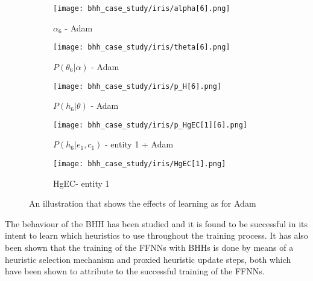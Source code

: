 \begin{figure}[htbp]
      \begin{subfigure}{0.5\textwidth}
            \centering
            \texttt{[image: bhh\_case\_study/iris/alpha[6].png]}
            \caption{$\alpha_{6}$ - \Acs{Adam}}
            \label{fig:results:case_study:iris:adam:alpha:6}
      \end{subfigure}
      \begin{subfigure}{0.5\textwidth}
            \centering
            \texttt{[image: bhh\_case\_study/iris/theta[6].png]}
            \caption{$P(\theta_{6} | \alpha)$ - \Acs{Adam}}
            \label{fig:results:case_study:iris:adam:p_theta:6}
      \end{subfigure}
      \par\bigskip
      \begin{subfigure}{0.5\textwidth}
            \centering
            \texttt{[image: bhh\_case\_study/iris/p\_H[6].png]}
            \caption{$P\left(h_{6} | \theta \right)$ - \Acs{Adam}}
            \label{fig:results:case_study:iris:adam:p_H:6}
      \end{subfigure}
      \begin{subfigure}{0.5\textwidth}
            \centering
            \texttt{[image: bhh\_case\_study/iris/p\_HgEC[1][6].png]}
            \caption{$P\left(h_{6}|e_{1},c_{1}\right)$ - entity 1 + \Acs{Adam} }
            \label{fig:results:case_study:iris:adam:p_HgEC:1:6}
      \end{subfigure}
      \par\bigskip
      \begin{subfigure}{\textwidth}
            \centering
            \texttt{[image: bhh\_case\_study/iris/HgEC[1].png]}
            \caption{HgEC\rbrack - entity 1}
            \label{fig:results:case_study:iris:adam:HgEC:1}
      \end{subfigure}
      \par\bigskip
      \caption{An illustration that shows the effects of learning as for \Acs{Adam}}
      \label{fig:results:case_study:iris:adam:HgEC}
\end{figure}


The behaviour of the \Ac{BHH} has been studied and it is found to be successful in its intent to learn which heuristics to use throughout the training process. It has also been shown that the training of the \acp{FFNN} with \Acp{BHH} is done by means of a heuristic selection mechanism and proxied heuristic update steps, both which have been shown to attribute to the successful training of the \acp{FFNN}.


